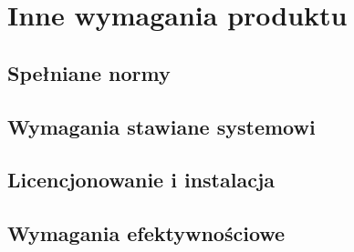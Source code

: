 \documentclass[11pt,leqno]{article}
\begin{document}
\section{Inne wymagania produktu}

\subsection{Spełniane normy}

\subsection{Wymagania stawiane systemowi}


\subsection{Licencjonowanie i instalacja}

\subsection{Wymagania efektywnościowe}
\end{document}
